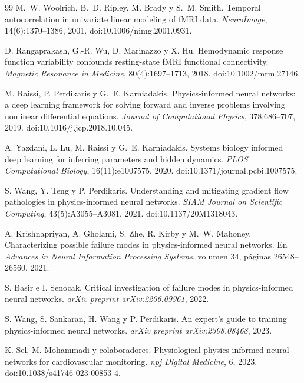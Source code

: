 \begin{thebibliography}{99}
M.~W. Woolrich, B.~D. Ripley, M. Brady y S.~M. Smith.
\newblock Temporal autocorrelation in univariate linear modeling of fMRI data.
\newblock \emph{NeuroImage}, 14(6):1370--1386, 2001.
\newblock doi:10.1006/nimg.2001.0931.

D. Rangaprakash, G.-R. Wu, D. Marinazzo y X. Hu.
\newblock Hemodynamic response function variability confounds resting-state fMRI functional connectivity.
\newblock \emph{Magnetic Resonance in Medicine}, 80(4):1697--1713, 2018.
\newblock doi:10.1002/mrm.27146.

M. Raissi, P. Perdikaris y G.~E. Karniadakis.
\newblock Physics-informed neural networks: a deep learning framework for solving forward and inverse problems involving nonlinear differential equations.
\newblock \emph{Journal of Computational Physics}, 378:686--707, 2019.
\newblock doi:10.1016/j.jcp.2018.10.045.

A. Yazdani, L. Lu, M. Raissi y G.~E. Karniadakis.
\newblock Systems biology informed deep learning for inferring parameters and hidden dynamics.
\newblock \emph{PLOS Computational Biology}, 16(11):e1007575, 2020.
\newblock doi:10.1371/journal.pcbi.1007575.

S. Wang, Y. Teng y P. Perdikaris.
\newblock Understanding and mitigating gradient flow pathologies in physics-informed neural networks.
\newblock \emph{SIAM Journal on Scientific Computing}, 43(5):A3055--A3081, 2021.
\newblock doi:10.1137/20M1318043.

A. Krishnapriyan, A. Gholami, S. Zhe, R. Kirby y M.~W. Mahoney.
\newblock Characterizing possible failure modes in physics-informed neural networks.
\newblock En \emph{Advances in Neural Information Processing Systems}, volumen 34, páginas 26548--26560, 2021.

S. Basir e I. Senocak.
\newblock Critical investigation of failure modes in physics-informed neural networks.
\newblock \emph{arXiv preprint arXiv:2206.09961}, 2022.

S. Wang, S. Sankaran, H. Wang y P. Perdikaris.
\newblock An expert's guide to training physics-informed neural networks.
\newblock \emph{arXiv preprint arXiv:2308.08468}, 2023.

K. Sel, M. Mohammadi y colaboradores.
\newblock Physiological physics-informed neural networks for cardiovascular monitoring.
\newblock \emph{npj Digital Medicine}, 6, 2023.
\newblock doi:10.1038/s41746-023-00853-4.


\end{thebibliography}
